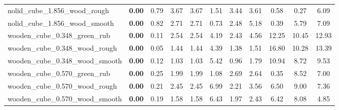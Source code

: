 \begin{table}[H]
{\begin{tabular}{l cccccccccc}
        nolid\_cube\_1.856\_wood\_rough & \textbf{0.00} & 0.79 & 3.67 & 3.67 & 1.51 & 3.44 & 3.61 & 0.58 & 0.27 & 6.09 \\
        nolid\_cube\_1.856\_wood\_smooth & \textbf{0.00} & 0.82 & 2.71 & 2.71 & 0.73 & 2.48 & 5.18 & 0.39 & 5.79 & 7.09 \\
        wooden\_cube\_0.348\_green\_rub & \textbf{0.00} & 0.11 & 2.54 & 2.54 & 4.19 & 2.43 & 4.56 & 12.25 & 10.45 & 12.93 \\
        wooden\_cube\_0.348\_wood\_rough & \textbf{0.00} & 0.05 & 1.44 & 1.44 & 4.39 & 1.38 & 1.51 & 16.80 & 10.28 & 13.39 \\
        wooden\_cube\_0.348\_wood\_smooth & \textbf{0.00} & 0.12 & 1.03 & 1.03 & 5.42 & 0.96 & 1.79 & 10.94 & 8.72 & 9.53 \\
        wooden\_cube\_0.570\_green\_rub & \textbf{0.00} & 0.25 & 1.99 & 1.99 & 1.08 & 2.69 & 2.64 & 0.35 & 8.52 & 7.00 \\
        wooden\_cube\_0.570\_wood\_rough & \textbf{0.00} & 0.21 & 2.45 & 2.45 & 6.99 & 2.21 & 3.56 & 6.50 & 9.00 & 7.36 \\
        wooden\_cube\_0.570\_wood\_smooth & \textbf{0.00} & 0.19 & 1.58 & 1.58 & 6.43 & 1.97 & 2.43 & 6.42 & 8.08 & 4.85 \\
        \bottomrule
    \end{tabular}
    }
\end{table}
